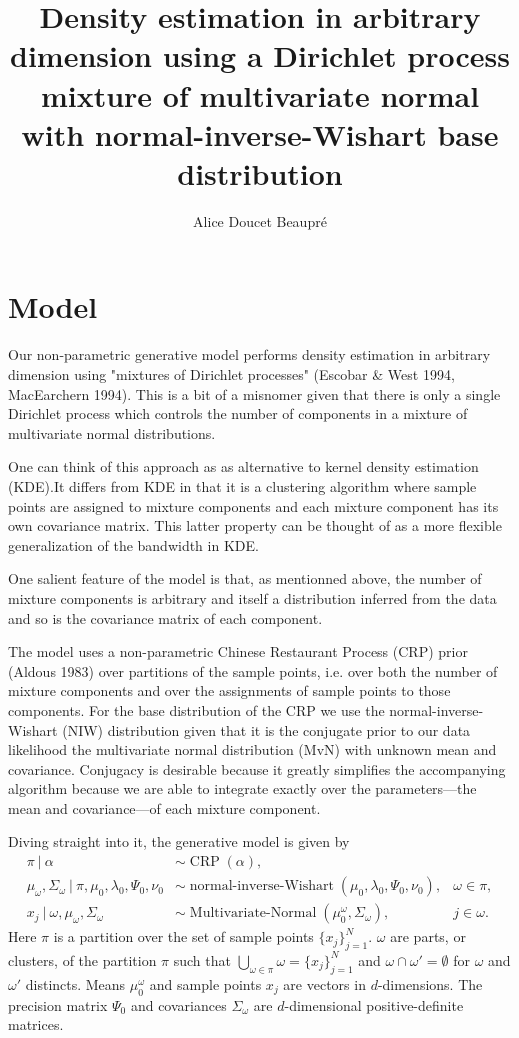 \documentclass[11pt, oneside]{article}   	%
\title{Density estimation in arbitrary dimension using a Dirichlet process mixture of multivariate normal with normal-inverse-Wishart base distribution}
\author{Alice Doucet Beaupr\'e}
\begin{document}
\maketitle
\section{Model}
Our non-parametric generative model performs density estimation in arbitrary dimension using "mixtures of Dirichlet processes" (Escobar \& West 1994, MacEarchern 1994). This is a bit of a misnomer given that there is only a single Dirichlet process which controls the number of components in a mixture of multivariate normal distributions.

One can think of this approach as as alternative to kernel density estimation (KDE).It differs from KDE in that it is a clustering algorithm where sample points are assigned to mixture components and each mixture component has its own covariance matrix. This latter property can be thought of as a more flexible generalization of the bandwidth in KDE.

One salient feature of the model is that, as mentionned above, the number of mixture components is arbitrary and itself a distribution inferred from the data and so is the covariance matrix of each component.

The model uses a non-parametric Chinese Restaurant Process (CRP) prior (Aldous 1983) over partitions of the sample points, i.e. over both the number of mixture components and over the assignments of sample points to those components. For the base distribution of the CRP we use the normal-inverse-Wishart (NIW) distribution given that it is the conjugate prior to our data likelihood the multivariate normal distribution (MvN) with unknown mean and covariance. Conjugacy is desirable because it greatly simplifies the accompanying algorithm because we are able to integrate exactly over the parameters—the mean and covariance—of each mixture component.

Diving straight into it, the generative model is given by
\begin{equation}\begin{aligned}
\pi~\vert~\alpha & \sim \operatorname{CRP}(\alpha), \\
\mu_\omega, \Sigma_\omega ~\vert~\pi,\mu_0, \lambda_0, \Psi_0, \nu_0 & \sim \operatorname{normal-inverse-Wishart}(\mu_0, \lambda_0, \Psi_0, \nu_0), &\omega\in\pi,\\
x_j~\vert~\omega, \mu_\omega, \Sigma_\omega & \sim \operatorname{Multivariate-Normal}(\mu_0^\omega, \Sigma_\omega),& j\in\omega.
\label{eq:model}\end{aligned}\end{equation}
Here $\pi$ is a partition over the set of sample points $\lbrace x_j\rbrace_{j=1}^N$. $\omega$ are parts, or clusters, of the partition $\pi$ such that $\bigcup_{\omega\in\pi}\omega = \lbrace x_j\rbrace_{j=1}^N$ and $\omega \cap\omega' = \emptyset$ for $\omega$ and $\omega'$ distincts. Means $\mu_0^\omega$ and sample points $x_j$ are vectors in $d$-dimensions. The precision matrix $\Psi_0$ and covariances $\Sigma_\omega$ are $d$-dimensional positive-definite matrices.
\end{document}
